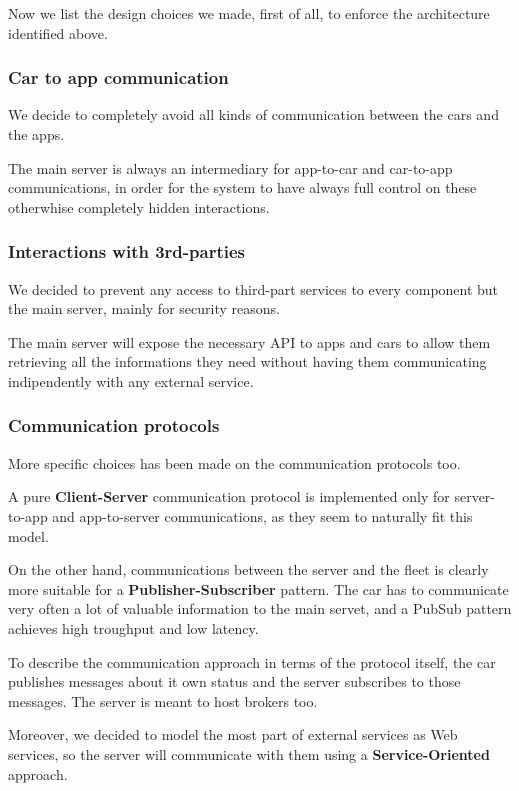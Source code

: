 \documentclass[11pt]{article} %
\begin{document}
Now we list the design choices we made, first of all, to enforce the architecture identified above. 

\subsubsection{Car to app communication}
We decide to completely avoid all kinds of communication between the cars and the apps. 

 The main server is always an intermediary for app-to-car and car-to-app communications, in order for the system to have always full control on these otherwhise completely hidden interactions.

\subsubsection{Interactions with 3rd-parties}
We decided to prevent any access to third-part services to every component but the main server, mainly for security reasons.

The main server will expose the necessary API to apps and cars to allow them retrieving all the informations they need without having them communicating indipendently with any external service.

\subsubsection{Communication protocols}
More specific choices has been made on the communication protocols too.

A pure \textbf{Client-Server} communication protocol is implemented only for server-to-app and app-to-server communications, as they seem to naturally fit this model.

On the other hand, communications between the server and the fleet is clearly more suitable for a \textbf{Publisher-Subscriber} pattern. The car has to communicate very often a lot of valuable information to the main servet, and a PubSub pattern achieves high troughput and low latency.
 
To describe the communication approach in terms of the protocol itself, the car publishes messages about it own status and the server subscribes to those messages. The server is meant to host brokers too.

Moreover, we decided to model the most part of external services as Web services, so the server will communicate with them using a \textbf{Service-Oriented} approach.
\end{document}
